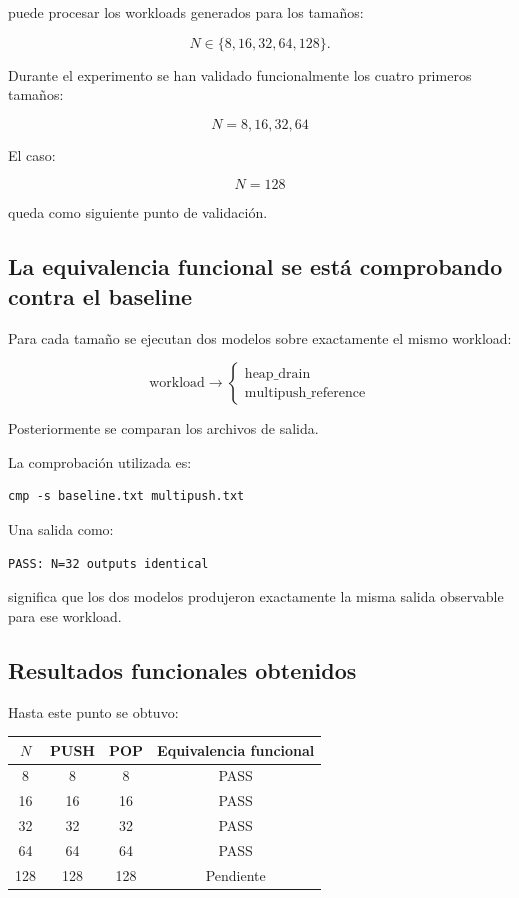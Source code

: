 \documentclass[11pt,a4paper]{article}
\begin{document}
puede procesar los workloads generados para los tamaños:

\[
N \in \{8,16,32,64,128\}.
\]

Durante el experimento se han validado funcionalmente los cuatro primeros
tamaños:

\[
\boxed{N=8,16,32,64}
\]

El caso:

\[
N=128
\]

queda como siguiente punto de validación.

\subsection{La equivalencia funcional se está comprobando contra el baseline}

Para cada tamaño se ejecutan dos modelos sobre exactamente el mismo
workload:

\[
\text{workload}
\rightarrow
\begin{cases}
\text{heap\_drain}\\
\text{multipush\_reference}
\end{cases}
\]

Posteriormente se comparan los archivos de salida.

La comprobación utilizada es:

\begin{lstlisting}[style=terminal]
cmp -s baseline.txt multipush.txt
\end{lstlisting}

Una salida como:

\begin{lstlisting}[style=textfile]
PASS: N=32 outputs identical
\end{lstlisting}

significa que los dos modelos produjeron exactamente la misma salida
observable para ese workload.

\subsection{Resultados funcionales obtenidos}

Hasta este punto se obtuvo:

\begin{center}
\begin{tabular}{c c c c}
\toprule
$N$ & PUSH & POP & Equivalencia funcional \\
\midrule
8   & 8   & 8   & PASS \\
16  & 16  & 16  & PASS \\
32  & 32  & 32  & PASS \\
64  & 64  & 64  & PASS \\
128 & 128 & 128 & Pendiente \\
\bottomrule
\end{tabular}
\end{center}
\end{document}
